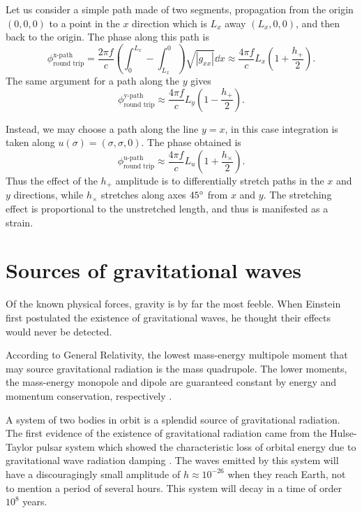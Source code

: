 Let us consider a simple path made of two segments, propagation from the origin $(0,0,0)$ to a point in the $x$ direction which is $L_x$ away $(L_x,0,0)$, and then back to the origin. %
The phase along this path is
\begin{equation}
\phi_{\text{round trip}}^{\text{x-path}}= \frac{2\pi f}{c} \left(\int_0^{L_x}-\int^0_{L_x}\right)\sqrt{|g_{xx}|}\dd x \approx \frac{4\pi f}{c} L_x \left(1+\frac{h_+}{2}\right).
\end{equation} 
The same argument for a path along the $y$ gives
\begin{equation}
\phi_{\text{round trip}}^{\text{y-path}} \approx \frac{4\pi f}{c} L_y \left(1-\frac{h_+}{2}\right).
\end{equation} 

Instead, we may choose a path along the line $y=x$, in this case integration is taken along $ u(\sigma) = (\sigma,\sigma,0)$. %
The phase obtained is
\begin{equation}
\phi_{\text{round trip}}^{\text{u-path}} \approx \frac{4\pi f}{c} L_u \left(1+\frac{h_\times}{2}\right).
\end{equation} 
Thus the effect of the $h_+$ amplitude is to differentially stretch paths in the $x$ and $y$ directions, while $h_\times$ stretches along axes $45 ^\circ$ from $x$ and $y$. %
 The stretching effect is proportional to the unstretched length, and thus is manifested as a strain.
\section{Sources of gravitational waves}
Of the known physical forces, gravity is by far the most feeble. %
When Einstein first postulated the existence of gravitational waves, he thought their effects would never be detected.

According to General Relativity, the lowest mass-energy multipole moment that may source gravitational radiation is the mass quadrupole. %
The lower moments, the mass-energy monopole and dipole are guaranteed constant by energy and momentum conservation, respectively \cite[Section 7.5]{carroll2004spacetime}.

A system of two bodies in orbit is a splendid source of gravitational radiation. %
The first evidence of the existence of gravitational radiation came from the Hulse-Taylor pulsar system which showed the characteristic loss of orbital energy due to gravitational wave radiation damping \cite{Taylor1979}. %
The waves emitted by this system will have a discouragingly small amplitude of $h\approx 10^{-26}$ when they reach Earth, not to mention a period of several hours. %
This system will decay in a time of order $10^8$ years.

